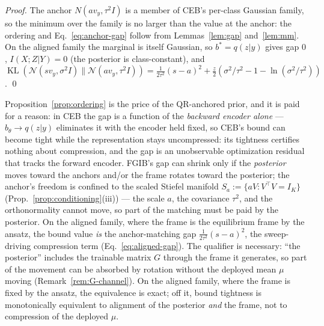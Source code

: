 \begin{proof}
The anchor $N(a v_y, \tau^2 I)$ is a member of CEB's per-class Gaussian family, so the
minimum over the family is no larger than the value at the anchor: the ordering and
Eq.~\eqref{eq:anchor-gap} follow from Lemmas~\ref{lem:gap} and~\ref{lem:mm}.
On the aligned family the marginal is itself Gaussian, so $b^* = q(z|y)$ gives gap $0$,
$I(X;Z|Y) = 0$ (the posterior is class-constant), and
$\operatorname{KL}(\mathcal{N}(s v_y, \sigma^2 I)\|\mathcal{N}(a v_y, \tau^2 I))
= \tfrac{1}{2\tau^2}(s-a)^2 + \tfrac{z}{2}(\sigma^2/\tau^2-1-\ln(\sigma^2/\tau^2))$.
\hfill\qed
\end{proof}

\begin{remark}\label{rem:force}
Proposition~\ref{prop:ordering} is the price of the QR-anchored prior, and it is paid
for a reason: in CEB the gap is a function of the \emph{backward encoder alone} ---
$b_\theta \to q(z|y)$ eliminates it with the encoder held fixed, so CEB's bound can
become tight while the representation stays uncompressed: its tightness certifies
nothing about compression, and the gap is an unobservable optimization residual that
tracks the forward encoder. FGIB's gap can shrink only if the \emph{posterior} moves
toward the anchors and/or the frame rotates toward the posterior; the anchor's freedom
is confined to the scaled Stiefel manifold $S_a := \{aV : V^{\top}V = I_K\}$
(Prop.~\ref{prop:conditioning}(iii)) --- the scale $a$, the covariance $\tau^2$, and
the orthonormality cannot move, so part of the matching must be paid by the posterior.
On the aligned family, where the frame is the equilibrium frame by the ansatz, the bound
value \emph{is} the anchor-matching gap
$\tfrac{1}{2\tau^2}(s-a)^2$, the sweep-driving compression term
(Eq.~\eqref{eq:aligned-gap}). The qualifier is necessary: ``the posterior'' includes
the trainable matrix $G$ through the frame it generates, so part of the movement can be
absorbed by rotation without the deployed mean $\mu$ moving
(Remark~\ref{rem:G-channel}). On the aligned family, where the frame is fixed by the
ansatz, the equivalence is exact; off it, bound tightness is monotonically equivalent to
alignment of the posterior \emph{and} the frame, not to compression of the deployed
$\mu$.
\end{remark}


